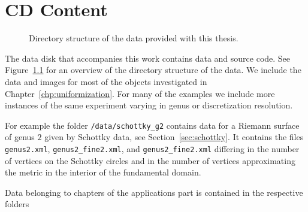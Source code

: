 \documentclass[Thesis]{subfiles}
\begin{document}
\chapter{CD Content}
\label{chp:cd_content}

\begin{figure}
\vspace{0.2cm}
\caption{Directory structure of the data provided with this thesis.}
\label{fig:dir_structure}
\end{figure}

The data disk that accompanies this work contains data and source code. 
See Figure~\ref{fig:dir_structure} for an overview of the directory structure of the data. 
We include the data and images for most of the objects investigated in Chapter~\ref{chp:uniformization}. 
For many of the examples we include more instances of the same experiment varying in genus or discretization resolution.

For example the folder {\tt /data/schottky\_g2} contains data for a Riemann surface of genus $2$ given by Schottky data, see Section~\ref{sec:schottky}.
It contains the files {\tt genus2.xml}, {\tt genus2\_fine2.xml}, and {\tt genus2\_fine2.xml} differing in the number of vertices on the Schottky circles and in the number of vertices approximating the metric in the interior of the fundamental domain.

Data belonging to chapters of the applications part is contained in the respective folders 
\end{document}
